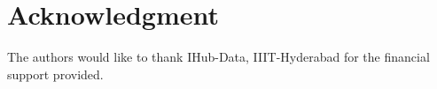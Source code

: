 \documentclass[10pt,journal,compsoc]{IEEEtran}
\begin{document}

%





  \section*{Acknowledgment}


The authors would like to thank IHub-Data, IIIT-Hyderabad for the financial support provided.
\end{document}
